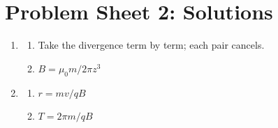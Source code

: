 \documentclass[12pt]{article}
\begin{document}
\section*{Problem Sheet 2: Solutions}

\begin{enumerate}

\item
  \begin{enumerate}
  \item Take the divergence term by term; each pair cancels.
  \item $B = \mu_0 m / 2\pi z^3$
  \end{enumerate}

\item
  \begin{enumerate}
  \item $r = mv / qB$
  \item $T = 2\pi m / qB$
  \end{enumerate}

\end{enumerate}
\end{document}
